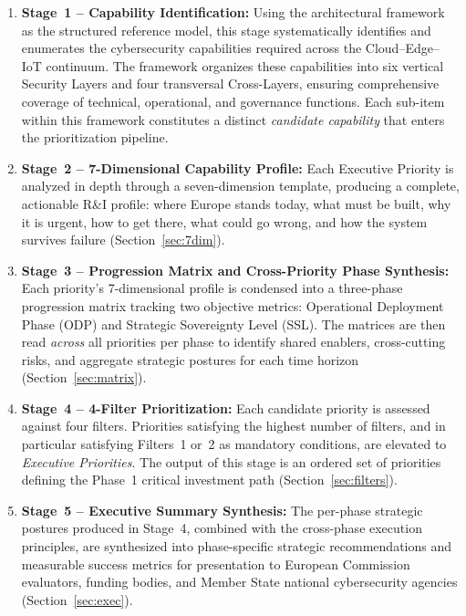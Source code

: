 \documentclass{ieeeaccess}
\begin{document}
\begin{enumerate}
\item \textbf{Stage~1 -- Capability Identification:}
Using the architectural framework as the structured reference model,
this stage systematically identifies and enumerates the cybersecurity
capabilities required across the Cloud--Edge--IoT continuum.
The framework organizes these capabilities into six vertical Security
Layers and four transversal Cross-Layers, ensuring comprehensive
coverage of technical, operational, and governance functions.
Each sub-item within this framework constitutes a distinct
\emph{candidate capability} that enters the prioritization pipeline.

    \item \textbf{Stage~2 -- 7-Dimensional Capability Profile:}
    Each Executive Priority is analyzed in depth through a seven-dimension
    template, producing a complete, actionable R\&I profile: where Europe
    stands today, what must be built, why it is urgent, how to get there,
    what could go wrong, and how the system survives failure
    (Section~\ref{sec:7dim}).

    \item \textbf{Stage~3 -- Progression Matrix and Cross-Priority Phase
    Synthesis:}
    Each priority's 7-dimensional profile is condensed into a three-phase
    progression matrix tracking two objective metrics: Operational Deployment
    Phase (ODP) and Strategic Sovereignty Level (SSL). The matrices are then
    read \emph{across} all priorities per phase to identify shared enablers,
    cross-cutting risks, and aggregate strategic postures for each time horizon
    (Section~\ref{sec:matrix}).

    \item \textbf{Stage~4 -- 4-Filter Prioritization:}
    Each candidate priority is assessed against four filters. Priorities
    satisfying the highest number of filters, and in particular satisfying
    Filters~1 or~2 as mandatory conditions, are elevated to
    \emph{Executive Priorities}. The output of this stage is an ordered
    set of priorities defining the Phase~1 critical investment path
    (Section~\ref{sec:filters}).

    \item \textbf{Stage~5 -- Executive Summary Synthesis:}
    The per-phase strategic postures produced in Stage~4, combined with the
    cross-phase execution principles, are synthesized into phase-specific
    strategic recommendations and measurable success metrics for presentation
    to European Commission evaluators, funding bodies, and Member State
    national cybersecurity agencies (Section~\ref{sec:exec}).
\end{enumerate}
\end{document}
